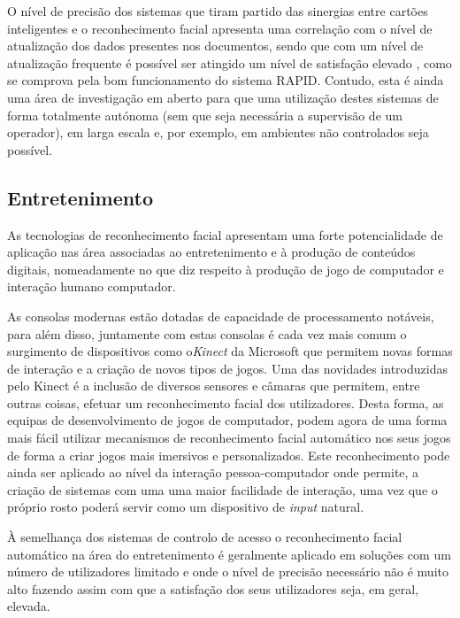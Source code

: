 O nível de precisão dos sistemas que tiram partido das sinergias entre cartões inteligentes e o reconhecimento facial apresenta uma correlação com o nível de atualização dos dados presentes nos documentos, sendo que  com um nível de atualização frequente é possível ser atingido um nível de satisfação elevado \cite{Li2011}, como se comprova pela bom funcionamento do sistema RAPID.
Contudo, esta é ainda uma área de investigação em aberto para que uma utilização destes sistemas de forma totalmente autónoma (sem que seja necessária a supervisão de um operador), em larga escala e, por exemplo, em ambientes não controlados seja possível.

\subsection{Entretenimento} \label{Entretenimento}
As tecnologias de reconhecimento facial apresentam uma forte potencialidade de aplicação nas área associadas ao entretenimento e à produção de conteúdos digitais, nomeadamente no que diz respeito à produção de jogo de computador e interação humano computador.

As consolas modernas estão dotadas de capacidade de processamento notáveis, para além disso, juntamente com estas consolas é cada vez mais comum o surgimento de dispositivos como o\textit{Kinect} da Microsoft que permitem novas formas de interação e a criação de novos tipos de jogos. Uma das novidades introduzidas pelo Kinect é a inclusão de diversos sensores e câmaras que permitem, entre outras coisas, efetuar um reconhecimento facial dos utilizadores. Desta forma, as equipas de desenvolvimento de jogos de computador, podem agora de uma forma mais fácil utilizar mecanismos de reconhecimento facial automático nos seus jogos de forma a criar jogos mais imersivos e personalizados. Este reconhecimento pode ainda ser aplicado ao nível da interação pessoa-computador  onde permite, a criação de sistemas com uma  uma maior facilidade de interação, uma vez que o próprio rosto poderá servir como um dispositivo de \textit{input} natural. 

À semelhança dos sistemas de controlo de acesso o reconhecimento facial automático na área do entretenimento é geralmente aplicado em soluções com um número de utilizadores limitado e onde o nível de precisão necessário não é muito alto fazendo assim com que a satisfação dos seus utilizadores seja, em geral, elevada.

